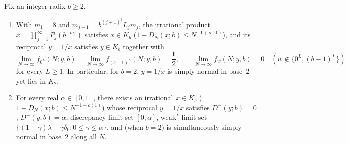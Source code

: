 \documentclass[11pt]{article}
\begin{document}
\begin{theorem}[Cyclotomic realization of $K_2$ simple normality and prescribed $D^+=\alpha$]\label{thm:cyclotomic-realization}
Fix an integer radix $b\ge2$.
\begin{enumerate}[label=\textup{(\roman*)},nosep]
\item With $m_1=8$ and $m_{j+1}=b^{(j+1)^3}L_jm_j$, the irrational product $x=\prod_{j=1}^\infty P_j(b^{-m_j})$ satisfies $x\in K_b$ ($1-D_N(x;b)\le N^{-1+o(1)}$), and its reciprocal $y=1/x$ satisfies $y\in K_b$ together with
\[
\lim_{N\to\infty}f_{0^L}(N;y,b)=\lim_{N\to\infty}f_{(b-1)^L}(N;y,b)=\frac12,\qquad
\lim_{N\to\infty}f_w(N;y,b)=0\quad(w\notin\{0^L,(b-1)^L\})
\]
for every $L\ge1$. In particular, for $b=2$, $y=1/x$ is simply normal in base~$2$ yet lies in $K_2$.
\item For every real $\alpha\in[0,1]$, there exists an irrational $x\in K_b$ ($1-D_N(x;b)\le N^{-1+o(1)}$) whose reciprocal $y=1/x$ satisfies $D^-(y;b)=0$, $D^+(y;b)=\alpha$, discrepancy limit set $[0,\alpha]$, weak$^*$ limit set $\{(1-\gamma)\lambda+\gamma\delta_0:0\le\gamma\le\alpha\}$, and (when $b=2$) is simultaneously simply normal in base~$2$ along all $N$.
\end{enumerate}
\end{theorem}
\end{document}
